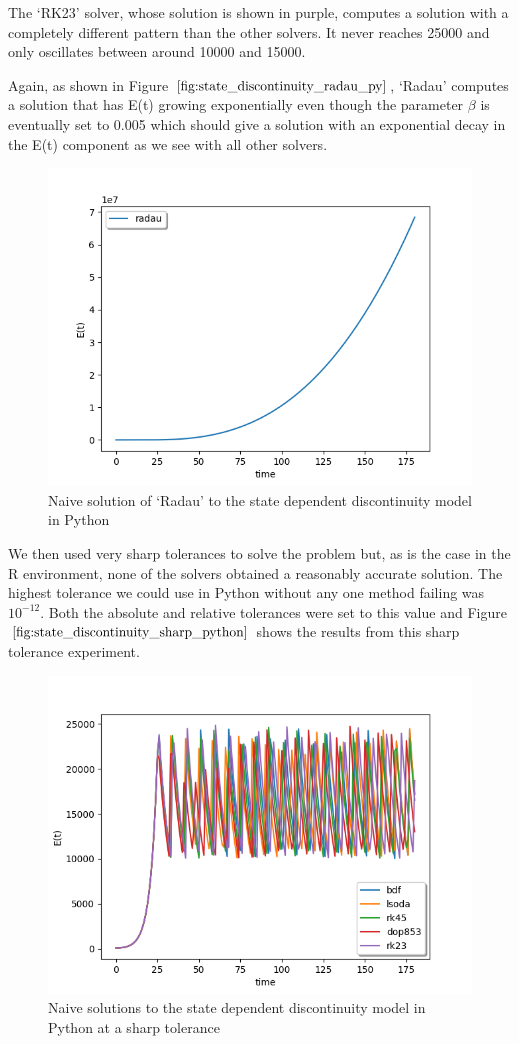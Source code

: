 The `RK23' solver, whose solution is shown in purple, computes a solution with a completely different pattern than the other solvers. It never reaches 25000 and only oscillates between around 10000 and 15000. 

Again, as shown in Figure $\ref{fig:state_discontinuity_radau_py}$, `Radau' computes a solution that has E(t) growing exponentially even though the parameter $\beta$ is eventually set to 0.005 which should give a solution with an exponential decay in the E(t) component as we see with all other solvers.

\begin{figure}[h]
\centering
\includegraphics[width=0.7\linewidth]{./figures/state_discontinuity_radau_py}
\caption{Naive solution of `Radau' to the state dependent discontinuity model in Python}
\label{fig:state_discontinuity_radau_py}
\end{figure}

We then used very sharp tolerances to solve the problem but, as is the case in the R environment, none of the solvers obtained a reasonably accurate solution. The highest tolerance we could use in Python without any one method failing was $10^{-12}$. Both the absolute and relative tolerances were set to this value and Figure $\ref{fig:state_discontinuity_sharp_python}$ shows the results from this sharp tolerance experiment.

\begin{figure}[H]
\centering
\includegraphics[width=0.7\linewidth]{./figures/state_discontinuity_sharp_py}
\caption{Naive solutions to the state dependent discontinuity model in Python at a sharp tolerance}
\label{fig:state_discontinuity_sharp_python}
\end{figure}

